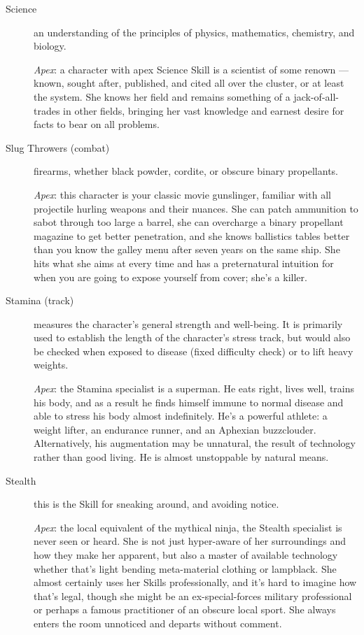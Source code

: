 \begin{description}
\item[Science]
an understanding of the principles of physics, mathematics, chemistry, and biology.

\emph{Apex}: a character with apex Science Skill is a scientist of some renown --- known, sought after, published, and cited all over the cluster, or at least the system. She knows her field and remains something of a jack-of-all-trades in other fields, bringing her vast knowledge and earnest desire for facts to bear on all problems.

\item[Slug Throwers (combat)]
firearms, whether black powder, cordite, or obscure binary propellants.

\emph{Apex}: this character is your classic movie gunslinger, familiar with all projectile hurling weapons and their nuances. She can patch ammunition to sabot through too large a barrel, she can overcharge a binary propellant magazine to get better penetration, and she knows ballistics tables better than you know the galley menu after seven years on the same ship. She hits what she aims at every time and has a preternatural intuition for when you are going to expose yourself from cover; she's a killer.

\item[Stamina (track)]
measures the character's general strength and well-being. It is primarily used to establish the length of the character's \Health{} stress track, but would also be checked when exposed to disease (fixed difficulty check) or to lift heavy weights.

\emph{Apex}: the Stamina specialist is a superman. He eats right, lives well, trains his body, and as a result he finds himself immune to normal disease and able to stress his body almost indefinitely. He's a powerful athlete: a weight lifter, an endurance runner, and an Aphexian buzzclouder. Alternatively, his augmentation may be unnatural, the result of technology rather than good living. He is almost unstoppable by natural means.

\item[Stealth]
this is the Skill for sneaking around, and avoiding notice.

\emph{Apex}: the local equivalent of the mythical ninja, the Stealth specialist is never seen or heard. She is not just hyper-aware of her surroundings and how they make her apparent, but also a master of available technology whether that's light bending meta-material clothing or lampblack. She almost certainly uses her Skills professionally, and it's hard to imagine how that's legal, though she might be an ex-special-forces military professional or perhaps a famous practitioner of an obscure local sport. She always enters the room unnoticed and departs without comment.


\end{description}
